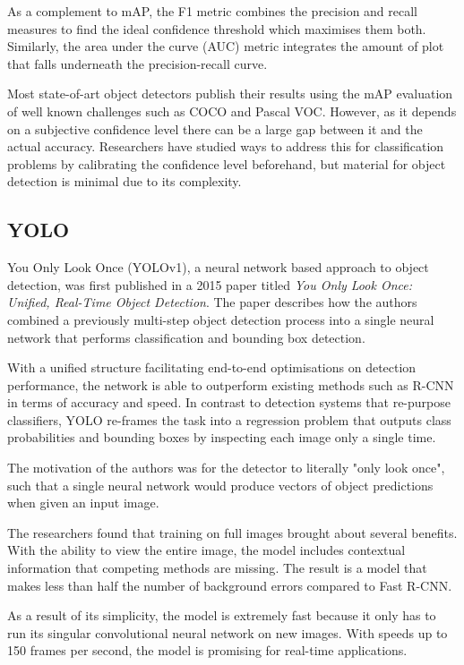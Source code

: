 \documentclass{thesis}
\begin{document}
As a complement to mAP, the F1 metric combines the precision and recall measures to find the ideal confidence threshold which maximises them both. Similarly,
the area under the curve (AUC) metric integrates the amount of plot that falls underneath the precision-recall curve.

Most state-of-art object detectors publish their results using the mAP evaluation of well known challenges such as COCO\cite{lin2015microsoft} and Pascal VOC\cite{Everingham15}. However, as it depends on a subjective confidence level there can be a large gap between it and the actual accuracy\cite{Peng2021}. Researchers have studied ways to address this for classification problems by calibrating the confidence level beforehand\cite{guo2017calibration}, but material for object detection is minimal due to its complexity.


\subsection{YOLO}

You Only Look Once (YOLOv1), a neural network based approach to object detection, was first published in a 2015 paper titled \textit{You Only Look Once: Unified, Real-Time Object Detection}. The paper describes how the authors combined a previously multi-step object detection process into a single neural network that performs classification and bounding box detection.

With a unified structure facilitating end-to-end optimisations on detection performance, the network is able to outperform existing methods such as R-CNN in terms of accuracy and speed\cite{yolov1}. In contrast to detection systems that re-purpose classifiers, YOLO re-frames the task into a regression problem that outputs class probabilities and bounding boxes by inspecting each image only a single time. 

The motivation of the authors was for the detector to literally "only look once", such that a single neural network would produce vectors of object predictions when given an input image.

The researchers found that training on full images brought about several benefits. With the ability to view the entire image, the model includes contextual information that competing methods are missing\cite{frcnn}. The result is a model that makes less than half the number of background errors compared to Fast R-CNN\cite{yolov1}.

As a result of its simplicity, the model is extremely fast because it only has to run its singular convolutional neural network on new images. With speeds up to 150 frames per second\cite{yolov1}, the model is promising for real-time applications.
\end{document}
